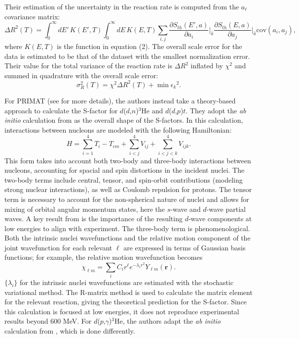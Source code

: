 \documentclass[%
 reprint,
superscriptaddress,
nofootinbib,
 amsmath,amssymb,
 aps,
 pra,
]{revtex4-2}
\begin{document}
Their estimation of the uncertainty in the reaction rate is computed from the $a_\ell$ covariance matrix: 
\begin{equation}
	\Delta R^2(T) = \int_0^\infty dE' \, K(E', T) \int_0^\infty dE \, K(E,T) \sum_{i,j} \frac{\partial S_{th} (E', a)}{\partial a_i}\biggr\rvert_{\hat{a}} \frac{\partial S_{th} (E, a)}{\partial a_j}\biggr\rvert_{\hat{a}} \text{cov}(a_i,a_j), \nonumber
\end{equation}
where $K(E,T)$ is the function in equation (2). The overall scale error for the data is estimated to be that of the dataset with the smallest normalization error. Their value for the total variance of the reaction rate is $\Delta R^2$ inflated by $\chi^2$ and summed in quadrature with the overall scale error: 
\begin{equation}
	\sigma_R^2(T) = \chi^2 \Delta R^2(T) + \min{\epsilon_k}^2. \nonumber
\end{equation}

For PRIMAT (see \cite{Inesta2017} for more details), the authors instead take a theory-based approach to calculate the S-factor for $d$($d$,$n$)$^3$He and $d$($d$,$p$)$t$. They adopt the \textit{ab initio} calculation from \cite{Arai2011} as the overall shape of the S-factors. In this calculation, interactions between nucleons are modeled with the following Hamiltonian:
\begin{equation}
	H = \sum_{i=1}^4 T_i - T_{cm} + \sum_{i<j}^4 V_{ij} + \sum_{i<j<k}^4 V_{ijk}. \nonumber
\end{equation}
This form takes into account both two-body and three-body interactions between nucleons, accounting for spacial and spin distortions in the incident nuclei. The two-body terms include central, tensor, and spin-orbit contributions (modeling strong nuclear interactions), as well as Coulomb repulsion for protons. The tensor term is necessary to account for the non-spherical nature of nuclei and allows for mixing of orbital angular momentum states, here the $s$-wave and $d$-wave partial waves. A key result from \cite{Arai2011} is the importance of the resulting $d$-wave components at low energies to align with experiment. The three-body term is phenomenological. Both the intrinsic nuclei wavefunctions and the relative motion component of the joint wavefunction for each relevant $\ell$ are expressed in terms of Gaussian basis functions; for example, the relative motion wavefunction becomes
\begin{equation}
	\chi_{\ell m} = \sum_i C_i r^\ell e^{-\lambda_i r^2} Y_{\ell m}(\hat{\mathbf{r}}). \nonumber
\end{equation}
$\{\lambda_i\}$ for the intrinsic nuclei wavefunctions are estimated with the stochastic variational method. The R-matrix method is used to calculate the matrix element for the relevant reaction, giving the theoretical prediction for the S-factor. Since this calculation is focused at low energies, it does not reproduce experimental results beyond 600 MeV. For $d$($p$,$\gamma$)$^3$He, the authors adapt the \textit{ab initio} calculation from \cite{Marcucci2016}, which is done differently. 
\end{document}
